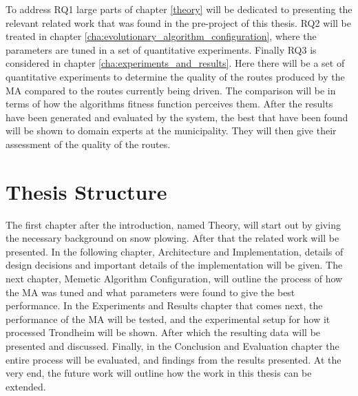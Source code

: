 To address RQ1 large parts of chapter \ref{theory} will be dedicated to presenting the relevant related work that was found in the pre-project of this thesis. RQ2 will be treated in chapter \ref{cha:evolutionary_algorithm_configuration}, where the parameters are tuned in a set of quantitative experiments. Finally RQ3 is considered in chapter \ref{cha:experiments_and_results}. Here there will be a set of quantitative experiments to determine the quality of the routes produced by the MA compared to the routes currently being driven. The comparison will be in terms of how the algorithms fitness function perceives them. After the results have been generated and evaluated by the system, the best that have been found will be shown to domain experts at the municipality. They will then give their assessment of the quality of the routes.

\section{Thesis Structure}

The first chapter after the introduction, named Theory, will start out by giving the necessary background on snow plowing. After that the related work will be presented. In the following chapter, Architecture and Implementation, details of design decisions and important details of the implementation will be given. The next chapter, Memetic Algorithm Configuration, will outline the process of how the MA was tuned and what parameters were found to give the best performance. In the Experiments and Results chapter that comes next, the performance of the MA will be tested, and the experimental setup for how it processed Trondheim will be shown. After which the resulting data will be presented and discussed. Finally, in the Conclusion and Evaluation chapter the entire process will be evaluated, and findings from the results presented. At the very end, the future work will outline how the work in this thesis can be extended.

\cleardoublepage
